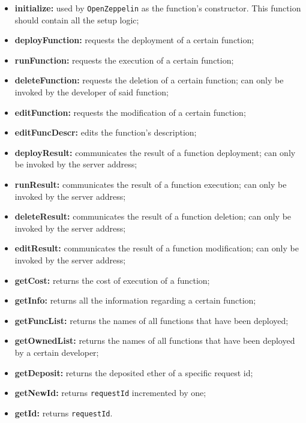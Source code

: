	\begin{itemize}
		\item \textbf{initialize:} used by \texttt{OpenZeppelin} as the function's constructor. This function should contain all the setup logic;
		\item \textbf{deployFunction:} requests the deployment of a certain function;
		\item \textbf{runFunction:} requests the execution of a certain function;
		\item \textbf{deleteFunction:} requests the deletion of a certain function; can only be invoked by the developer of said function;
		\item \textbf{editFunction:} requests the modification of a certain function;
		\item \textbf{editFuncDescr:} edits the function's description;
		\item \textbf{deployResult:} communicates the result of a function deployment; can only be invoked by the server address;
		\item \textbf{runResult:} communicates the result of a function execution; can only be invoked by the server address;
		\item \textbf{deleteResult:} communicates the result of a function deletion; can only be invoked by the server address;
		\item \textbf{editResult:} communicates the result of a function modification; can only be invoked by the server address;
		\item \textbf{getCost:} returns the cost of execution of a function;
		\item \textbf{getInfo:} returns all the information regarding a certain function;
		\item \textbf{getFuncList:} returns the names of all functions that have been deployed;
		\item \textbf{getOwnedList:} returns the names of all functions that have been deployed by a certain developer;
		\item \textbf{getDeposit:} returns the deposited ether of a specific request id;
		\item \textbf{getNewId:} returns \texttt{requestId} incremented by one;
		\item \textbf{getId:} returns \texttt{requestId}.
	\end{itemize}

